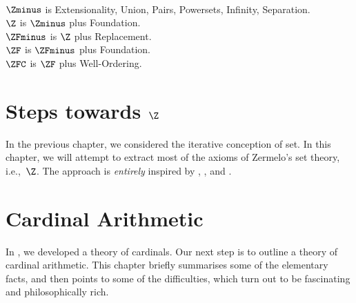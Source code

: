 \
\\$\Zminus$ is Extensionality, Union, Pairs, Powersets, Infinity, Separation.
\\$\Z$ is $\Zminus$ plus Foundation.
\\$\ZFminus$ is $\Z$ plus Replacement.
\\$\ZF$ is $\ZFminus$ plus Foundation.
\\$\ZFC$ is $\ZF$ plus Well-Ordering.


\chapter{Steps towards $\Z$}

In the previous chapter, we considered the iterative conception of
set. In this chapter, we will attempt to extract most of the axioms of
Zermelo's set theory, i.e.,~$\Z$. The approach is \emph{entirely}
inspired by \citet{Boolos1971},  \citet{Scott1974}, and
\citet{Shoenfield:AST}. 

\olresetchapter






\chapter{Cardinal Arithmetic}

In , we developed a theory of cardinals.
Our next step is to outline a theory of cardinal arithmetic. This
chapter briefly summarises some of the elementary facts, and then
points to some of the difficulties, which turn out to be fascinating
and philosophically rich.

\olresetchapter


\stopproblems
\def\ifproblems#1{}

